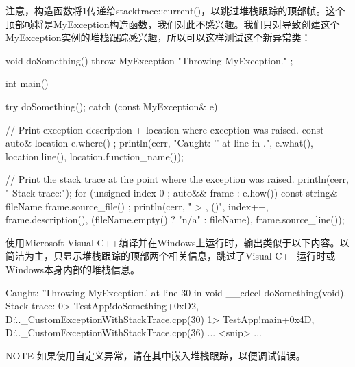 注意，构造函数将1传递给stacktrace::current()，以跳过堆栈跟踪的顶部帧。这个顶部帧将是MyException构造函数，我们对此不感兴趣。我们只对导致创建这个MyException实例的堆栈跟踪感兴趣，所以可以这样测试这个新异常类：

\begin{cpp}
void doSomething()
{
    throw MyException { "Throwing MyException." };
}

int main()
{
    try {
        doSomething();
    } catch (const MyException& e) {
        // Print exception description + location where exception was raised.
        const auto& location { e.where() };
        println(cerr, "Caught: '{}' at line {} in {}.",
            e.what(), location.line(), location.function_name());

        // Print the stack trace at the point where the exception was raised.
        println(cerr, " Stack trace:");
        for (unsigned index { 0 }; auto&& frame : e.how()) {
            const string& fileName { frame.source_file() };
            println(cerr, " {}> {}, {}({})", index++, frame.description(),
                (fileName.empty() ? "n/a" : fileName), frame.source_line());
        }
    }
}
\end{cpp}

使用Microsoft Visual C++编译并在Windows上运行时，输出类似于以下内容。以简洁为主，只显示堆栈跟踪的顶部两个相关信息，跳过了Visual C++运行时或Windows本身内部的堆栈信息。

\begin{shell}
Caught: 'Throwing MyException.' at line 30 in void __cdecl doSomething(void).
  Stack trace:
    0> TestApp!doSomething+0xD2, D:\..._CustomExceptionWithStackTrace.cpp(30)
    1> TestApp!main+0x4D, D:\..._CustomExceptionWithStackTrace.cpp(36)
    ... <snip> ...
\end{shell}

\begin{myNotic}{NOTE}
如果使用自定义异常，请在其中嵌入堆栈跟踪，以便调试错误。
\end{myNotic}













